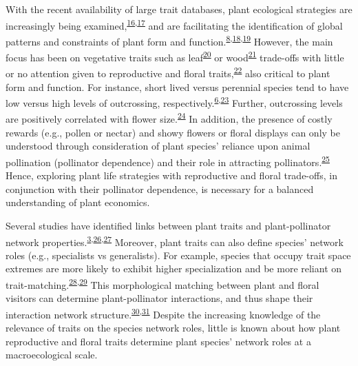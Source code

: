 \documentclass[
  12pt,
  a4paper,
]{article}
\begin{document}
With the recent availability of large trait databases, plant ecological strategies are increasingly being examined,\textsuperscript{\protect\hyperlink{ref-kattge2011}{16},\protect\hyperlink{ref-salguero2015}{17}} and are facilitating the identification of global patterns and constraints of plant form and function.\textsuperscript{\protect\hyperlink{ref-salguero2016}{8},\protect\hyperlink{ref-diaz2016}{18},\protect\hyperlink{ref-carmona2021}{19}} However, the main focus has been on vegetative traits such as leaf\textsuperscript{\protect\hyperlink{ref-wright2004}{20}} or wood\textsuperscript{\protect\hyperlink{ref-chave2009}{21}} trade-offs with little or no attention given to reproductive and floral traits,\textsuperscript{\protect\hyperlink{ref-evojtko2020}{22}} also critical to plant form and function. For instance, short lived versus perennial species tend to have low versus high levels of outcrossing, respectively.\textsuperscript{\protect\hyperlink{ref-moeller2017}{6},\protect\hyperlink{ref-barrett2003}{23}} Further, outcrossing levels are positively correlated with flower size.\textsuperscript{\protect\hyperlink{ref-goodwillie2010}{24}} In addition, the presence of costly rewards (e.g., pollen or nectar) and showy flowers or floral displays can only be understood through consideration of plant species' reliance upon animal pollination (pollinator dependence) and their role in attracting pollinators.\textsuperscript{\protect\hyperlink{ref-ollerton2011}{25}} Hence, exploring plant life strategies with reproductive and floral trade-offs, in conjunction with their pollinator dependence, is necessary for a balanced understanding of plant economics.

Several studies have identified links between plant traits and plant-pollinator network properties.\textsuperscript{\protect\hyperlink{ref-carvalheiro2014}{3},\protect\hyperlink{ref-lazaro2008}{26},\protect\hyperlink{ref-bartomeus2013}{27}} Moreover, plant traits can also define species' network roles (e.g., specialists vs generalists). For example, species that occupy trait space extremes are more likely to exhibit higher specialization and be more reliant on trait-matching.\textsuperscript{\protect\hyperlink{ref-junker2013}{28},\protect\hyperlink{ref-coux2016}{29}} This morphological matching between plant and floral visitors can determine plant-pollinator interactions, and thus shape their interaction network structure.\textsuperscript{\protect\hyperlink{ref-stang2009}{30},\protect\hyperlink{ref-ibanez2012}{31}} Despite the increasing knowledge of the relevance of traits on the species network roles, little is known about how plant reproductive and floral traits determine plant species' network roles at a macroecological scale.
\end{document}

